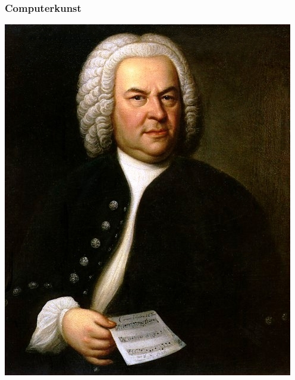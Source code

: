 \documentclass[aspectratio=43,x11names]{beamer}
\begin{document}
\begin{frame}[fragile]
\frametitle{Computerkunst}

\begin{minipage}{0.45\textwidth}
\begin{center}
\includegraphics[width=\textwidth, keepaspectratio]{images/bach} 
\end{center}
\end{minipage}
\begin{minipage}{0.45\textwidth}
\begin{center}

\end{center}
\end{minipage}
\end{frame}
\end{document}
